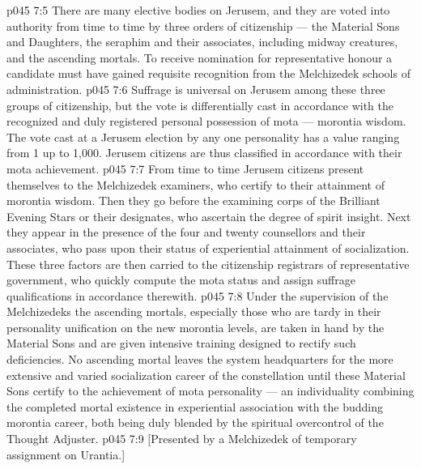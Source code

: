 \vs p045 7:5 \pc There are many elective bodies on Jerusem, and they are voted into authority from time to time by three orders of citizenship --- the Material Sons and Daughters, the seraphim and their associates, including midway creatures, and the ascending mortals. To receive nomination for representative honour a candidate must have gained requisite recognition from the Melchizedek schools of administration.
\vs p045 7:6 Suffrage is universal on Jerusem among these three groups of citizenship, but the vote is differentially cast in accordance with the recognized and duly registered personal possession of mota --- morontia wisdom. The vote cast at a Jerusem election by any one personality has a value ranging from 1 up to 1,000. Jerusem citizens are thus classified in accordance with their mota achievement.
\vs p045 7:7 From time to time Jerusem citizens present themselves to the Melchizedek examiners, who certify to their attainment of morontia wisdom. Then they go before the examining corps of the Brilliant Evening Stars or their designates, who ascertain the degree of spirit insight. Next they appear in the presence of the four and twenty counsellors and their associates, who pass upon their status of experiential attainment of socialization. These three factors are then carried to the citizenship registrars of representative government, who quickly compute the mota status and assign suffrage qualifications in accordance therewith.
\vs p045 7:8 \pc Under the supervision of the Melchizedeks the ascending mortals, especially those who are tardy in their personality unification on the new morontia levels, are taken in hand by the Material Sons and are given intensive training designed to rectify such deficiencies. No ascending mortal leaves the system headquarters for the more extensive and varied socialization career of the constellation until these Material Sons certify to the achievement of mota personality --- an individuality combining the completed mortal existence in experiential association with the budding morontia career, both being duly blended by the spiritual overcontrol of the Thought Adjuster.
\vsetoff
\vs p045 7:9 [Presented by a Melchizedek of temporary assignment on Urantia.]
